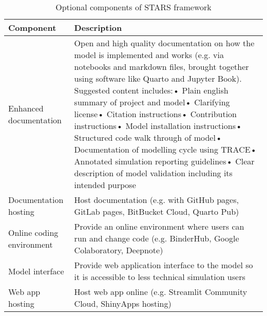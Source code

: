 \begin{table}[H]
\centering
\caption{Optional components of STARS framework}
\vspace{0.2cm}
\label{table:stars-optional}
\tymin=3cm
{\renewcommand{\arraystretch}{1.2}
    \begin{tabulary}{\linewidth}{@{}LL@{}}
        \toprule
        Component & Description
        \\\midrule
        Enhanced documentation & Open and high quality documentation on how the model is implemented and works  (e.g. via notebooks and markdown files, brought together using software like Quarto and Jupyter Book). Suggested content includes:\newline• Plain english summary of project and model\newline• Clarifying license\newline• Citation instructions\newline• Contribution instructions\newline• Model installation instructions\newline• Structured code walk through of model\newline• Documentation of modelling cycle using TRACE\newline• Annotated simulation reporting guidelines\newline• Clear description of model validation including its intended purpose
        \\\addlinespace
        Documentation hosting & Host documentation (e.g. with GitHub pages, GitLab pages, BitBucket Cloud, Quarto Pub)
        \\\addlinespace
        Online coding environment & Provide an online environment where users can run and change code (e.g. BinderHub, Google Colaboratory, Deepnote)
        \\\addlinespace
        Model interface & Provide web application interface to the model so it is accessible to less technical simulation users
        \\\addlinespace
        Web app hosting & Host web app online (e.g. Streamlit Community Cloud, ShinyApps hosting)
        \\\bottomrule
    \end{tabulary}
}
\end{table}